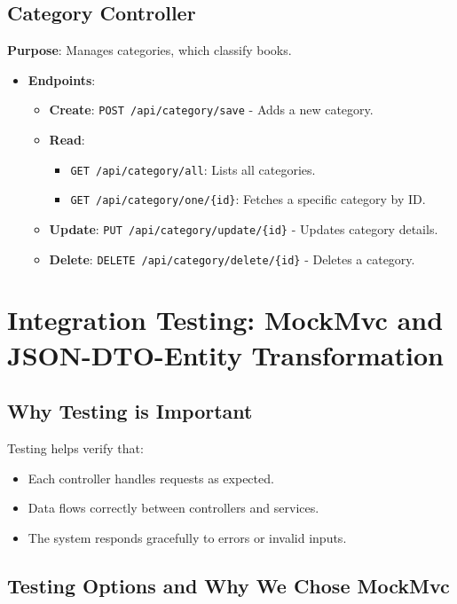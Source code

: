 \documentclass[a4paper,12pt]{article}
\begin{document}
\subsection{Category Controller}
\textbf{Purpose}: Manages categories, which classify books.
\begin{itemize}
    \item \textbf{Endpoints}:
    \begin{itemize}
        \item \textbf{Create}: \texttt{POST /api/category/save} - Adds a new category.
        \item \textbf{Read}:
        \begin{itemize}
            \item \texttt{GET /api/category/all}: Lists all categories.
            \item \texttt{GET /api/category/one/\{id\}}: Fetches a specific category by ID.
        \end{itemize}
        \item \textbf{Update}: \texttt{PUT /api/category/update/\{id\}} - Updates category details.
        \item \textbf{Delete}: \texttt{DELETE /api/category/delete/\{id\}} - Deletes a category.
    \end{itemize}
\end{itemize}

\section{Integration Testing: MockMvc and JSON-DTO-Entity Transformation}

\subsection{Why Testing is Important}
Testing helps verify that:
\begin{itemize}
    \item Each controller handles requests as expected.
    \item Data flows correctly between controllers and services.
    \item The system responds gracefully to errors or invalid inputs.
\end{itemize}
\subsection{Testing Options and Why We Chose MockMvc}
\end{document}
